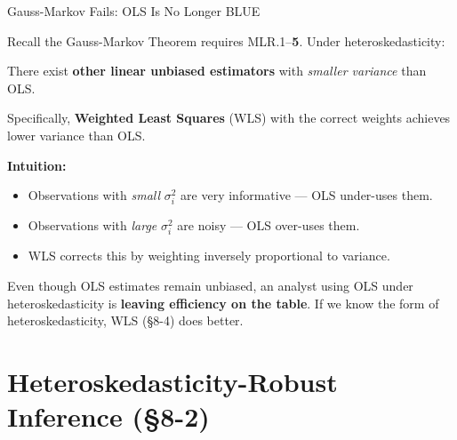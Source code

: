 \documentclass[aspectratio=169, 12pt]{beamer}
\begin{document}
\begin{frame}{Gauss-Markov Fails: OLS Is No Longer BLUE}

  Recall the Gauss-Markov Theorem requires MLR.1--\textbf{5}. Under heteroskedasticity:

  \begin{highlightbox}
    There exist \textbf{other linear unbiased estimators} with \textit{smaller variance} than OLS.

    Specifically, \textbf{Weighted Least Squares} (WLS) with the correct weights achieves lower variance than OLS.
  \end{highlightbox}

  \smallskip

  \textbf{Intuition:}
  \begin{itemize}
    \item Observations with \textit{small} $\sigma_i^2$ are very informative — OLS under-uses them.
    \item Observations with \textit{large} $\sigma_i^2$ are noisy — OLS over-uses them.
    \item WLS corrects this by weighting inversely proportional to variance.
  \end{itemize}

  \smallskip

  \begin{keybox}
    Even though OLS estimates remain unbiased, an analyst using OLS under heteroskedasticity is \textbf{leaving efficiency on the table}. If we know the form of heteroskedasticity, WLS (§8-4) does better.
  \end{keybox}

\end{frame}

\section{Heteroskedasticity-Robust Inference (\S8-2)}
\end{document}
